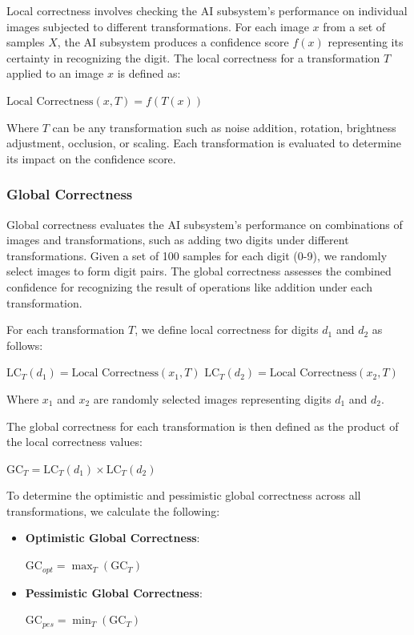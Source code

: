 \documentclass[10pt, conference, a4paper, final]{IEEEtran}
\begin{document}
    Local correctness involves checking the AI subsystem's performance on individual images subjected to different transformations. For each image $x$ from a set of samples $X$, the AI subsystem produces a confidence score $f(x)$ representing its certainty in recognizing the digit. The local correctness for a transformation $T$ applied to an image $x$ is defined as:


    $ \text{Local Correctness}(x, T) = f(T(x))$


    Where $T$ can be any transformation such as noise addition, rotation, brightness adjustment, occlusion, or scaling. Each transformation is evaluated to determine its impact on the confidence score.

    
    \subsubsection{Global Correctness}

    Global correctness evaluates the AI subsystem's performance on combinations of images and transformations, such as adding two digits under different transformations. Given a set of 100 samples for each digit (0-9), we randomly select images to form digit pairs. The global correctness assesses the combined confidence for recognizing the result of operations like addition under each transformation.

    For each transformation $T$, we define local correctness for digits $d_1$ and $d_2$ as follows:
    
    $ \text{LC}_{T}(d_1) = \text{Local Correctness}(x_1, T)$
    $\text{LC}_{T}(d_2) = \text{Local Correctness}(x_2, T)$
    

    Where $x_1$ and $x_2$ are randomly selected images representing digits $d_1$ and $d_2$.
    
    The global correctness for each transformation is then defined as the product of the local correctness values:
    
    $\text{GC}_{T} = \text{LC}_{T}(d_1) \times \text{LC}_{T}(d_2)$
    
    To determine the optimistic and pessimistic global correctness across all transformations, we calculate the following:
    
    \begin{itemize}
        \item \textbf{Optimistic Global Correctness}:

        $\text{GC}_{opt} = \max_{T} (\text{GC}_{T})$
        \item \textbf{Pessimistic Global Correctness}:
    
        $\text{GC}_{pes} = \min_{T} (\text{GC}_{T})$

    \end{itemize}
    
\end{document}
